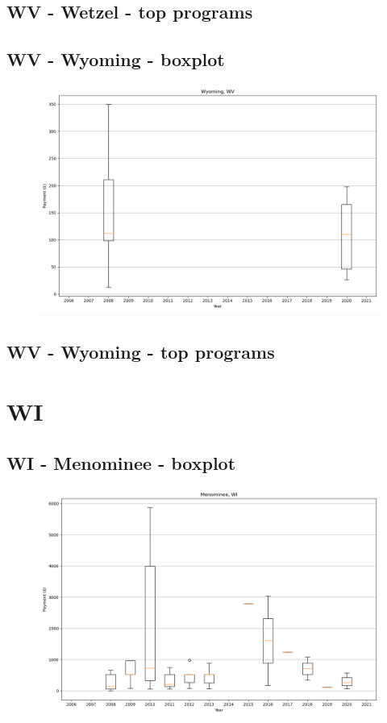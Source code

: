 \subsection*{WV - Wetzel - top programs}

\newpage
\subsection*{WV - Wyoming - boxplot}
\begin{figure}[h]
\centering
\includegraphics[width=7in]{../output/boxplots/counties/Wyoming-WV_boxplot.png}
\end{figure}


\subsection*{WV - Wyoming - top programs}

\newpage
\section*{WI}
\subsection*{WI - Menominee - boxplot}
\begin{figure}[h]
\centering
\includegraphics[width=7in]{../output/boxplots/counties/Menominee-WI_boxplot.png}
\end{figure}


